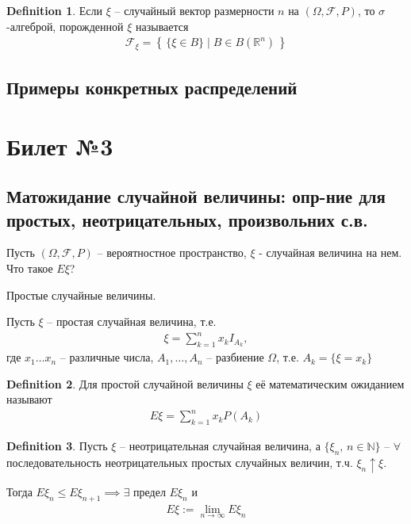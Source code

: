 \documentclass[a4paper]{article}
\theoremstyle{plain}
\theoremstyle{remark}
\theoremstyle{definition}
\newtheorem{definition}{Definition}
\newcommand{\setRn}{\mathbb{R}^n}
\newcommand{\setN}{\mathbb{N}}
\newcommand{\setF}{\mathcal{F}}
\newcommand{\braces}[1]{\left\{ #1 \right\}} %
\newcommand{\condset}[2]{\braces{\, #1 \mid #2 \,}} %
\renewcommand{\leq}{\leqslant}
\begin{document}
\begin{definition}
  Если $\xi$ -- случайный вектор размерности $n$ на $(\Omega, \setF, P)$, 
  то $\sigma$-алгеброй, порожденной $\xi$ называется
  \begin{align*}
    \setF_\xi = \condset{\{ \xi \in B \}}{B \in B(\setRn)}
  \end{align*}
\end{definition}

\subsection{Примеры конкретных распределений}


\section{Билет №3}
\subsection{Матожидание случайной величины: опр-ние для простых, неотрицательных, произвольних с.в.}
Пусть $(\Omega, \setF, P)$ -- вероятностное пространство, $\xi$ - случайная величина на нем. 
Что такое $E \xi$?

Простые случайные величины.

Пусть $\xi$ -- простая случайная величина, т.е. 
\begin{align*}
  \xi = \sum_{k = 1}^{n} x_k I_{A_k},
\end{align*}
где $x_1 \ldots x_n$ -- различные числа, $A_1, \ldots, A_n$ 
-- разбиение $\Omega$, т.е. $A_k = \{ \xi = x_k \}$

\begin{definition}
  Для простой случайной величины $\xi$ её математическим ожиданием называют
  \begin{align*}
    E\xi = \sum_{k = 1}^n x_k P(A_k)
  \end{align*}
\end{definition}

\begin{definition}
  Пусть $\xi$ -- неотрицательная случайная величина, 
  а $\{ \xi_n,\, n \in \setN \}$ -- $\forall$ последовательность неотрицательных 
  простых случайных величин, т.ч. $\xi_n \uparrow \xi$. 

  Тогда $E \xi_n \leq E \xi_{n + 1} \implies \exists$ предел $E \xi_n$ и
  \begin{align*}
    E \xi := \lim_{n \to \infty} E \xi_n
  \end{align*}
\end{definition}
\end{document}
